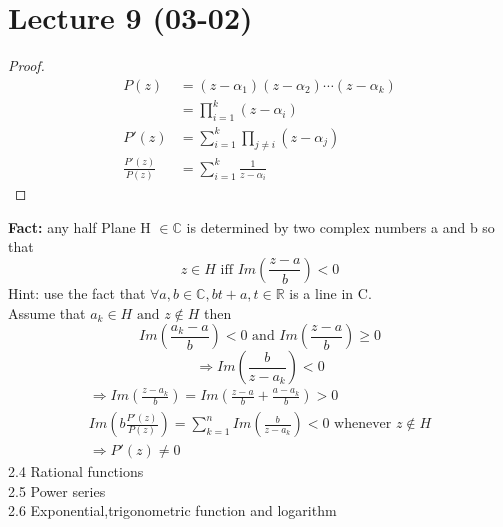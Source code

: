 \section{Lecture 9 (03-02)}
\begin{proof}
    \begin{align*}{}{}
    P(z)&=(z-\alpha_1)(z-\alpha_2)\cdots(z-\alpha_k)\\
    &=\prod_{i=1}^{k}(z-\alpha_i)\\
    P'(z)&=\sum_{i=1}^{k}\prod_{j\neq i}(z-\alpha_j)\\
    \frac{P'(z)}{P(z)}&=\sum_{i=1}^{k}\frac{1}{z-\alpha_i}
    \end{align*}
\end{proof}
\textbf{Fact:}
any half Plane H $ \in \mathbb{C} $ is determined by two complex numbers a and b so that $$
    z\in H \text{ iff }Im(\frac{z-a}{b})<0
$$ Hint: use the fact that $ \forall a,b\in \mathbb{C},bt+a,t\in \mathbb{R} $ is a line in C.
\\Assume that $ a_k\in H \text{ and }z \notin H $  then$$
    Im(\frac{a_k-a}{b})<0 \text{ and } Im(\frac{z-a}{b})\geq 0$$
    $$
        \Rightarrow Im(\frac{b}{z-a_k})<0
    $$ 
    \begin{align*}{}{}
    \Rightarrow Im(\frac{z-a_k}{b})=Im(\frac{z-a}{b}+\frac{a-a_k}{b})> 0\\
    Im(b\frac{P'(z)}{P(z)})=\sum_{k=1}^{n}Im(\frac{b}{z-a_k})<0 \text{ whenever }z\notin H\\
    \Rightarrow P'(z)\neq 0
    \end{align*}
    2.4 Rational functions\\
    2.5 Power series\\
    2.6 Exponential,trigonometric function and logarithm\\
